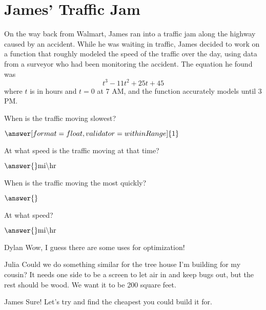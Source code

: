 \documentclass{ximera}
\begin{document}
\section{James' Traffic Jam}
On the way back from Walmart, James ran into a traffic jam along the highway caused by an accident. While he was waiting in traffic, James decided to work on a function that roughly modeled the speed of the traffic over the day, using data from a surveyor who had been monitoring the accident. The equation he found was $$t^3-11t^2+25t+45$$ where $t$ is in hours and $t = 0$ at 7 AM, and the function accurately models until 3 PM.
\begin{question}

When is the traffic moving slowest?

$\answer[format=float, validator=withinRange]{1}$ \begin{multipleChoice}
\end{multipleChoice}

At what speed is the traffic moving at that time?

$\answer{} \text{mi} \backslash \text{hr}$
\end{question}
\begin{question}

When is the traffic moving the most quickly?

$\answer{}$\begin{multipleChoice}
\end{multipleChoice}

At what speed?

$\answer{} \text{mi} \backslash \text{hr}$

\end{question}
\begin{dialogue}
\item[Dylan] Wow, I guess there are some uses for optimization!
\item[Julia] Could we do something similar for the tree house I'm building for my cousin? It needs one side to be a screen to let air in and keep bugs out, but the rest should be wood. We want it to be 200 square feet.
\item[James] Sure! Let's try and find the cheapest you could build it for.
\end{dialogue}
\end{document}
